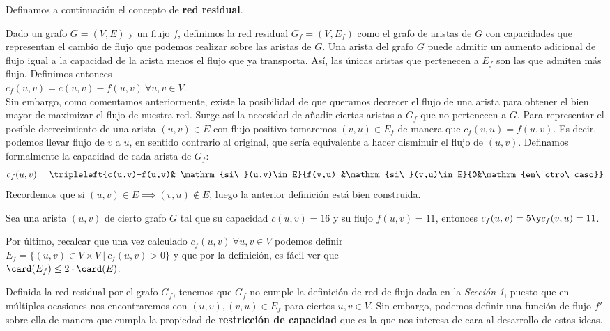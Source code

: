 \begin{defi} Definamos a continuación el concepto de \textbf{red residual}.

Dado un grafo $G=(V,E)$ y un flujo $f$, definimos la red residual $G_f=(V,E_f)$ como el grafo de aristas de $G$ con capacidades que representan el cambio de flujo que podemos realizar sobre las aristas de $G$. Una arista del grafo $G$ puede admitir un aumento adicional de flujo igual a la capacidad de la arista menos el flujo que ya transporta. Así, las únicas aristas que pertenecen a $E_f$ son las que admiten más flujo. Definimos entonces\\
$c_f(u,v)=c(u,v)-f(u,v)\ \forall u,v\in V$.\\

Sin embargo, como comentamos anteriormente, existe la posibilidad de que queramos decrecer el flujo de una arista para obtener el bien mayor de maximizar el flujo de nuestra red. Surge así la necesidad de añadir ciertas aristas a $G_f$ que no pertenecen a $G$. Para representar el posible decrecimiento de una arista $(u,v)\in E$ con flujo positivo tomaremos $(v,u)\in E_f$ de manera que $c_f(v,u)=f(u,v)$. Es decir, podemos llevar flujo de $v$ a $u$, en sentido contrario al original, que sería equivalente a hacer disminuir el flujo de $(u,v)$. Definamos formalmente la capacidad de cada arista de $G_f$:
\[c_f(u,v)=\tripleleft{c(u,v)-f(u,v)& \mathrm{si\ }(u,v)\in E}{f(v,u) &\mathrm{si\ }(v,u)\in E}{0&\mathrm{en\ otro\ caso}}\]
Recordemos que si $(u,v)\in E\implies (v,u)\notin E$, luego la anterior definición está bien construida.

\begin{ejem} Sea una arista $(u,v)$ de cierto grafo $G$ tal que su capacidad $c(u,v) =16$ y su flujo $f(u,v)=11$, entonces $c_f(u,v) = 5\y c_f(v,u)=11$.
\end{ejem}

Por último, recalcar que una vez calculado $c_f(u,v)\ \forall u,v\in V$ podemos definir\\
$E_f=\{(u,v)\in V\times V\ |\ c_f(u,v)>0\}$ y que por la definición, es fácil ver que\\
$\card(E_f)\leq 2\cdot\card(E)$.
\end{defi}

Definida la red residual por el grafo $G_f$, tenemos que $G_f$ no cumple la definición de red de flujo dada en la \textit{Sección 1}, puesto que en múltiples ocasiones nos encontraremos con $(u,v),(v,u)\in E_f$ para ciertos $u,v\in V$. Sin embargo, podemos definir una función de flujo $f'$ sobre ella de manera que cumpla la propiedad de \textbf{restricción de capacidad} que es la que nos interesa de cara al desarrollo de estas ideas.

